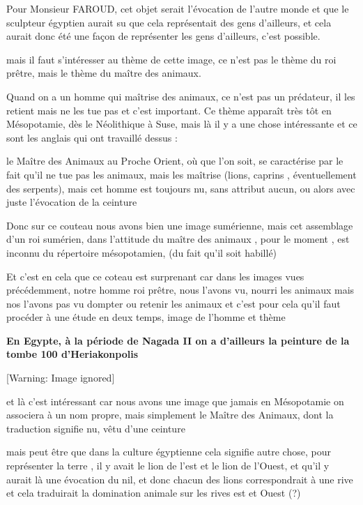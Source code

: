 \documentclass[a4paper,10pt]{article}
\begin{document}
Pour Monsieur FAROUD, cet objet serait l'évocation de
l'autre monde et que le sculpteur égyptien aurait su
que cela représentait des gens d'ailleurs,  et cela
aurait donc été une façon de représenter les gens
d'ailleurs, c'est possible.

mais il faut s'intéresser au thème de cette image, ce
n'est pas le thème du roi prêtre, mais le thème du
maître des animaux.

Quand on a un homme qui maîtrise des animaux, ce n'est
pas un prédateur, il les retient mais ne les tue pas et
c'est important. Ce thème apparaît très tôt en
Mésopotamie, dès le Néolithique à Suse, mais là il y a une chose
intéressante et ce sont les anglais qui ont travaillé dessus : 

le Maître des Animaux au Proche Orient, où que l'on
soit, se caractérise par le fait qu'il ne tue pas les
animaux,  mais les maîtrise (lions, caprins , éventuellement des
serpents), mais cet homme est toujours nu, sans attribut aucun, ou
alors avec juste l'évocation de la ceinture 

Donc sur ce couteau nous avons bien une image sumérienne, mais cet
assemblage d'un roi sumérien, dans
l'attitude du maître des animaux , pour le moment ,
est inconnu du répertoire mésopotamien, (du fait qu'il
soit habillé)

Et c'est en cela que ce coteau est surprenant car dans
les images vues précédemment, notre homme roi prêtre, nous
l'avons vu, nourri les animaux mais nos
l'avons pas vu dompter ou retenir les animaux  et
c'est pour cela qu'il faut procéder à
une étude en deux temps, image de l'homme et thème

\textbf{En Egypte, à la période de Nagada II on a
d'ailleurs la peinture de la tombe 100
d'Heriakonpolis}

  [Warning: Image ignored] %
 

et là c'est intéressant car nous avons une image que
jamais en  Mésopotamie on associera à un nom propre, mais simplement le
Maître des Animaux, dont la traduction signifie nu, vêtu
d'une ceinture 

mais peut être que dans la culture égyptienne cela signifie autre chose,
pour représenter la terre , il y avait le lion de
l'est et le lion de l'Ouest,  et
qu'il y aurait là une évocation du nil, et donc chacun
des lions correspondrait à une rive et cela traduirait la domination
animale sur les rives est et Ouest (?)

\end{document}
